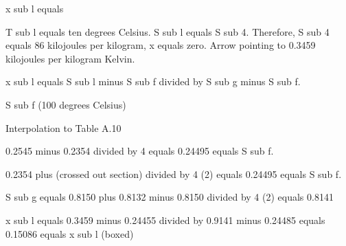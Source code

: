 x sub l equals

T sub l equals ten degrees Celsius. S sub l equals S sub 4. Therefore, S sub 4 equals 86 kilojoules per kilogram, x equals zero. Arrow pointing to 0.3459 kilojoules per kilogram Kelvin.

x sub l equals S sub l minus S sub f divided by S sub g minus S sub f.

S sub f (100 degrees Celsius)

Interpolation to Table A.10

0.2545 minus 0.2354 divided by 4 equals 0.24495 equals S sub f.

0.2354 plus (crossed out section) divided by 4 (2) equals 0.24495 equals S sub f.

S sub g equals 0.8150 plus 0.8132 minus 0.8150 divided by 4 (2) equals 0.8141

x sub l equals 0.3459 minus 0.24455 divided by 0.9141 minus 0.24485 equals 0.15086 equals x sub l (boxed)